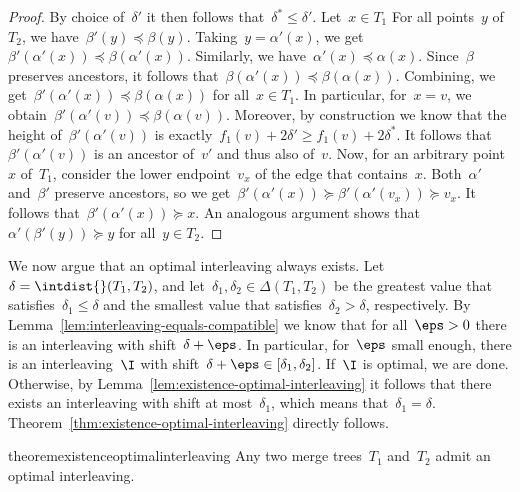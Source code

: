 \begin{proof}
	By choice of~$\delta'$ it then follows that~$\delta^* \le \delta'$.
    Let~$x \in T_1$
    For all points~$y$ of~$T_2$, we have~$\beta'(y) \preceq \beta(y)$.
    Taking~$y = \alpha'(x)$, we get~$\beta'(\alpha'(x)) \preceq \beta(\alpha'(x))$.
    Similarly, we have~$\alpha'(x) \preceq \alpha(x)$.
    Since~$\beta$ preserves ancestors, it follows that~$\beta(\alpha'(x)) \preceq \beta(\alpha(x))$.
    Combining, we get~$\beta'(\alpha'(x)) \preceq \beta(\alpha(x))$ for all~$x \in T_1$.
	In particular, for~$x = v$, we obtain~$\beta'(\alpha'(v)) \preceq \beta(\alpha(v))$.
	Moreover, by construction we know that the height of~$\beta'(\alpha'(v))$ is exactly~$f_1(v) + 2\delta' \ge f_1(v) + 2\delta^*$.
	It follows that~$\beta'(\alpha'(v))$ is an ancestor of~$v'$ and thus also of~$v$.
	Now, for an arbitrary point~$x$ of~$T_1$, consider the lower endpoint~$v_x$ of the edge that contains~$x$.
	Both~$\alpha'$ and~$\beta'$ preserve ancestors, so we get~$\beta'(\alpha'(x)) \succeq \beta'(\alpha'(v_x)) \succeq v_x$. 
	It follows that~$\beta'(\alpha'(x)) \succeq x$.
	An analogous argument shows that $\alpha'(\beta'(y)) \succeq y$ for all~$y \in T_2$.
\end{proof}
%
\noindent
We now argue that an optimal interleaving always exists.
Let~$\delta = \intdist{}(T_1, T_2)$, and let~$\delta_1, \delta_2 \in \Delta(T_1, T_2)$ be the greatest value that satisfies~$\delta_1 \le \delta$ and the smallest value that satisfies~$\delta_2 > \delta$, respectively.
By Lemma~\ref{lem:interleaving-equals-compatible} we know that for all~$\eps > 0$ there is an interleaving with shift~$\delta + \eps$.
In particular, for~$\eps$ small enough, there is an interleaving~$\I$ with shift~$\delta + \eps \in [\delta_1, \delta_2]$.
If~$\I$ is optimal, we are done.
Otherwise, by Lemma~\ref{lem:existence-optimal-interleaving} it follows that there exists an interleaving with shift at most~$\delta_1$, which means that~$\delta_1 = \delta$.
Theorem~\ref{thm:existence-optimal-interleaving} directly follows.
%
\begin{restatable}{theorem}{existenceoptimalinterleaving}
\label{thm:existence-optimal-interleaving}
	Any two merge trees~$T_1$ and~$T_2$ admit an optimal interleaving.
\end{restatable}
%
